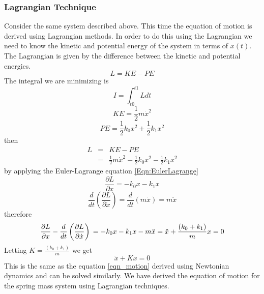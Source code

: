 \subsubsection{Lagrangian Technique}
\label{Sec:LagrangianTechnique}
Consider the same system described above. This time the equation of motion is
derived using Lagrangian methods. In order to do this using the Lagrangian we
need to know the kinetic and potential energy of the system in terms of $x(t)$.
The Lagrangian is given by the difference between the kinetic and potential
energies.
\begin{equation}
	\label{Lagrangian}
	L = KE - PE
\end{equation}
The integral we are minimizing is 
\[
I = \int_{t0}^{t1} L dt
\]
\begin{equation}
	KE = \frac{1}{2}m\dot{x}^2
\end{equation}
\begin{equation}
	PE = \frac{1}{2}k_0x^2 + \frac{1}{2}k_1x^2
\end{equation}
then 
\begin{eqnarray*}
L&=&KE - PE\\
	&=&\frac{1}{2}m\dot{x}^2 - \frac{1}{2}k_0x^2 - \frac{1}{2}k_1x^2
\end{eqnarray*}
by applying the Euler-Lagrange equation \ref{Eqn:EulerLagrange}
\begin{equation}
	\frac{\partial L}{\partial x} = -k_0x - k_1x
\end{equation}
\begin{equation}
	\frac{d}{dt}\left(\frac{\partial L}{\partial \dot{x}}\right) = \frac{d}{dt}\left(m\dot{x}\right) = m\ddot{x}
\end{equation}
therefore
\begin{equation}
	\frac{\partial L}{\partial x} - \frac{d}{dt}\left(\frac{\partial L}{\partial \dot{x}}\right)\\
	= -k_0x - k_1x - m\ddot{x}\\
	= \ddot{x} + \frac{(k_{0} + k_{1})}{m}x 
	= 0
\end{equation}
Letting $K = \frac{(k_{0} + k_{1})}{m}$ we get
\begin{equation}
	\ddot{x} + Kx = 0
\end{equation}
This is the same as the equation \ref{eqn_motion} derived using Newtonian
dynamics and can be solved similarly. We have
derived the equation of motion for the spring mass system using Lagrangian
techniques.

